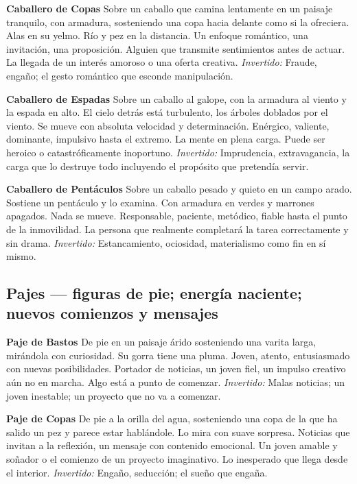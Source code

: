 \textbf{Caballero de Copas} Sobre un caballo que camina lentamente en un paisaje tranquilo, con armadura, sosteniendo una copa hacia delante como si la ofreciera. Alas en su yelmo. Río y pez en la distancia. Un enfoque romántico, una invitación, una proposición. Alguien que transmite sentimientos antes de actuar. La llegada de un interés amoroso o una oferta creativa. \emph{Invertido:} Fraude, engaño; el gesto romántico que esconde manipulación.

\textbf{Caballero de Espadas} Sobre un caballo al galope, con la armadura al viento y la espada en alto. El cielo detrás está turbulento, los árboles doblados por el viento. Se mueve con absoluta velocidad y determinación. Enérgico, valiente, dominante, impulsivo hasta el extremo. La mente en plena carga. Puede ser heroico o catastróficamente inoportuno. \emph{Invertido:} Imprudencia, extravagancia, la carga que lo destruye todo incluyendo el propósito que pretendía servir.

\textbf{Caballero de Pentáculos} Sobre un caballo pesado y quieto en un campo arado. Sostiene un pentáculo y lo examina. Con armadura en verdes y marrones apagados. Nada se mueve. Responsable, paciente, metódico, fiable hasta el punto de la inmovilidad. La persona que realmente completará la tarea correctamente y sin drama. \emph{Invertido:} Estancamiento, ociosidad, materialismo como fin en sí mismo.

\subsection{Pajes --- figuras de pie; energía naciente; nuevos comienzos y mensajes}\label{pages--standing-figures-nascent-energy-new-beginnings-and-messages}

\textbf{Paje de Bastos} De pie en un paisaje árido sosteniendo una varita larga, mirándola con curiosidad. Su gorra tiene una pluma. Joven, atento, entusiasmado con nuevas posibilidades. Portador de noticias, un joven fiel, un impulso creativo aún no en marcha. Algo está a punto de comenzar. \emph{Invertido:} Malas noticias; un joven inestable; un proyecto que no va a comenzar.

\textbf{Paje de Copas} De pie a la orilla del agua, sosteniendo una copa de la que ha salido un pez y parece estar hablándole. Lo mira con suave sorpresa. Noticias que invitan a la reflexión, un mensaje con contenido emocional. Un joven amable y soñador o el comienzo de un proyecto imaginativo. Lo inesperado que llega desde el interior. \emph{Invertido:} Engaño, seducción; el sueño que engaña.

